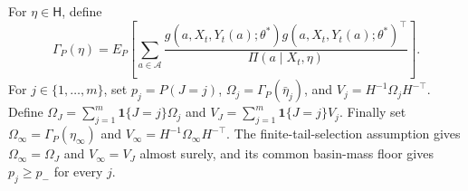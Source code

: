 For \(\eta\in\mathsf H\), define
\[
 \Gamma_P(\eta)=E_P\!\left[\sum_{a\in\mathcal A}
 \frac{g(a,X_t,Y_t(a);\theta^*)g(a,X_t,Y_t(a);\theta^*)^\top}
 {\Pi(a\mid X_t,\eta)}\right].
\]
For \(j\in\{1,\ldots,m\}\), set \(p_j=P(J=j)\), \(\Omega_j=\Gamma_P(\bar\eta_j)\), and \(V_j=H^{-1}\Omega_jH^{-\top}\). Define \(\Omega_J=\sum_{j=1}^m\mathbf 1\{J=j\}\Omega_j\) and \(V_J=\sum_{j=1}^m\mathbf 1\{J=j\}V_j\). Finally set \(\Omega_\infty=\Gamma_P(\eta_\infty)\) and \(V_\infty=H^{-1}\Omega_\infty H^{-\top}\). The finite-tail-selection assumption gives \(\Omega_\infty=\Omega_J\) and \(V_\infty=V_J\) almost surely, and its common basin-mass floor gives \(p_j\ge p_-\) for every \(j\).